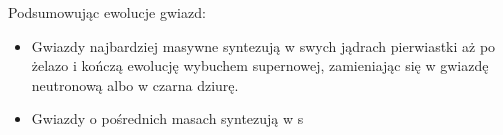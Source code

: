 \documentclass[../index.tex]{subfiles}
\begin{document}
            Podsumowując ewolucje gwiazd:
            \begin{itemize}
                \item Gwiazdy najbardziej masywne syntezują w swych jądrach pierwiastki aż po żelazo i kończą ewolucję wybuchem supernowej, zamieniając się w gwiazdę neutronową albo w czarna dziurę.
                \item Gwiazdy o pośrednich masach syntezują w s

            \end{itemize}
\end{document}
